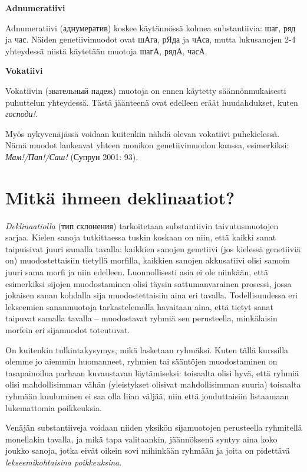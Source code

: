 \documentclass[]{scrreprt}
\begin{document}
\textbf{Adnumeratiivi}

Adnumeratiivi (аднумератив) koskee käytännössä kolmea substantiivia:
шаг, ряд ja час. Näiden genetiivimuodot ovat шАга, рЯда ja чАса, mutta
lukusanojen 2-4 yhteydessä niistä käytetään muotoja шагА, рядА, часА.

\textbf{Vokatiivi}

Vokatiivin (звательный падеж) muotoja on ennen käytetty
säännönmukaisesti puhuttelun yhteydessä. Tästä jäänteenä ovat edelleen
eräät huudahdukset, kuten \emph{господи!}.

Myös nykyvenäjässä voidaan kuitenkin nähdä olevan vokatiivi
puhekielessä. Nämä muodot lankeavat yhteen monikon genetiivimuodon
kanssa, esimerkiksi: \emph{Мам!/Пап!/Саш!} (Супрун 2001: 93).

\section{Mitkä ihmeen
deklinaatiot?}\label{mitkuxe4-ihmeen-deklinaatiot}

\emph{Deklinaatiolla} (тип склонения) tarkoitetaan substantiivin
taivutusmuotojen sarjaa. Kielen sanoja tutkittaessa tuskin koskaan on
niin, että kaikki sanat taipuisivat juuri samalla tavalla: kaikkien
sanojen genetiivi (jos kielessä genetiiviä on) muodostettaisiin tietyllä
morfilla, kaikkien sanojen akkusatiivi olisi samoin juuri sama morfi ja
niin edelleen. Luonnollisesti asia ei ole niinkään, että esimerkiksi
sijojen muodostaminen olisi täysin sattumanvarainen prosessi, jossa
jokaisen sanan kohdalla sija muodostettaisiin aina eri tavalla.
Todellisuudessa eri lekseemien sananmuotoja tarkastelemalla havaitaan
aina, että tietyt sanat taipuvat samalla tavalla -- muodostavat ryhmiä
sen perusteella, minkälaisin morfein eri sijamuodot toteutuvat.

On kuitenkin tulkintakysymys, mikä lasketaan ryhmäksi. Kuten tällä
kurssilla olemme jo aiemmin huomanneet, ryhmien tai sääntöjen
muodostaminen on tasapainoilua parhaan kuvaustavan löytämiseksi:
toisaalta olisi hyvä, että ryhmiä olisi mahdollisimman vähän
(yleistykset olisivat mahdollisimman suuria) toisaalta ryhmään
kuuluminen ei saa olla liian väljää, niin että jouduttaisiin listaamaan
lukemattomia poikkeuksia.

Venäjän substantiiveja voidaan niiden yksikön sijamuotojen perusteella
ryhmitellä monellakin tavalla, ja mikä tapa valitaankin, jäännöksenä
syntyy aina koko joukko sanoja, jotka eivät oikein sovi mihinkään
ryhmään ja joita on pidettävä \emph{lekseemikohtaisina poikkeuksina}.
\end{document}
